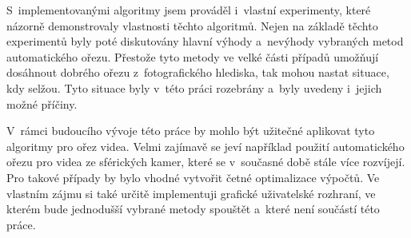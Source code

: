 S~implementovanými algoritmy jsem prováděl i~vlastní experimenty, které názorně demonstrovaly vlastnosti těchto algoritmů. Nejen na základě těchto experimentů byly poté diskutovány hlavní výhody a~nevýhody vybraných metod automatického ořezu. Přestože tyto metody ve velké části případů umožňují dosáhnout dobrého ořezu z~fotografického hlediska, tak mohou nastat situace, kdy selžou. Tyto situace byly v~této práci rozebrány a~byly uvedeny i~jejich možné příčiny.

V~rámci budoucího vývoje této práce by mohlo být užitečné aplikovat tyto algoritmy pro ořez videa. Velmi zajímavě se jeví například použití automatického ořezu pro videa ze sférických kamer, které se v~současné době stále více rozvíjejí. Pro takové případy by bylo vhodné vytvořit četné optimalizace výpočtů. Ve vlastním zájmu si také určitě implementuji grafické uživatelské rozhraní, ve kterém bude jednodušší vybrané metody spouštět a~které není součástí této práce.



